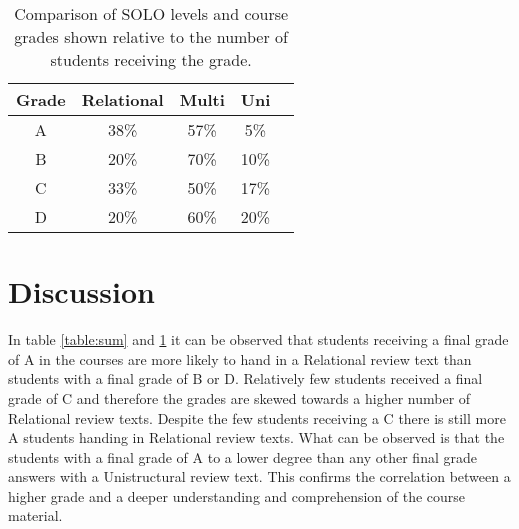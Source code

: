 \documentclass[twoside,twocolumn,a4paper,11pt,english]{article}
\begin{document}
\begin{table}[H]
\caption{Comparison of SOLO levels and course grades shown relative to the number of students receiving the grade.}
\centering
\begin{tabular}{c | c c c c}
Grade & Relational & Multi & Uni \\ [0.5ex] %
\hline
A & 38\% & 57\% & 5\% \\
B & 20\% & 70\% & 10\% \\
C & 33\% & 50\% & 17\% \\
D & 20\% & 60\% & 20\% \\ [1ex]
\end{tabular}
\label{table:percentage}
\end{table}




\section{Discussion}

In table \ref{table:sum} and \ref{table:percentage} it can be observed that students receiving a final grade of A in the courses are more likely to hand in a Relational review text than students with a final grade of B or D. Relatively few students received a final grade of C and therefore the grades are skewed towards a higher number of Relational review texts. Despite the few students receiving a C there is still more A students handing in Relational review texts. What can be observed is that the students with a final grade of A to a lower degree than any other final grade answers with a Unistructural review text. This confirms the correlation between a higher grade and a deeper understanding and comprehension of the course material.
\end{document}

